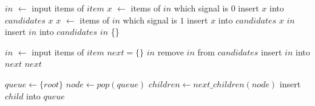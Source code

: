 \documentclass[12pt,a4paper]{article}
\begin{document}
{\linespread{1}

\begin{algorithm}
\caption{$static\_analysis(candidates, item)$}
\begin{algorithmic}[1]
\STATE $in$ $\leftarrow$ input items of $item$
    \STATE $x$ $\leftarrow$ items of $in$ which signal is $0$
        \STATE insert $x$ into $candidates$
        \RETURN $x$
    \ENDIF
{}
    \STATE $x$ $\leftarrow$ items of $in$ which signal is $1$
        \STATE insert $x$ into $candidates$
        \RETURN $x$
    \ENDIF
{}
    \RETURN $in$
\ELSE
    \STATE insert $in$ into $candidates$
    \RETURN $in$
\ENDIF
\RETURN \{\}
\end{algorithmic}
\end{algorithm}

\begin{algorithm}
\caption{$dynamic\_analysis(candidates, item)$}
\begin{algorithmic}[1]
\STATE $in$ $\leftarrow$ input items of $item$
\STATE $next = \{\}$
    \RETURN $in$
\ENDIF
{}
        \STATE remove $in$ from $candidates$
        \STATE insert $in$ into $next$
    \ENDIF
\ENDFOR
\RETURN $next$
\end{algorithmic}
\end{algorithm}

\begin{algorithm}
\caption{$breadth\_first\_traversal(root, next\_children)$}
\begin{algorithmic}[1]
\STATE $queue \leftarrow \{root\}$
    \STATE $node \leftarrow pop(queue)$
    \STATE $children \leftarrow next\_children(node)$
    \STATE insert $child$ into $queue$
\ENDWHILE
\end{algorithmic}
\end{algorithm}

}
\end{document}

